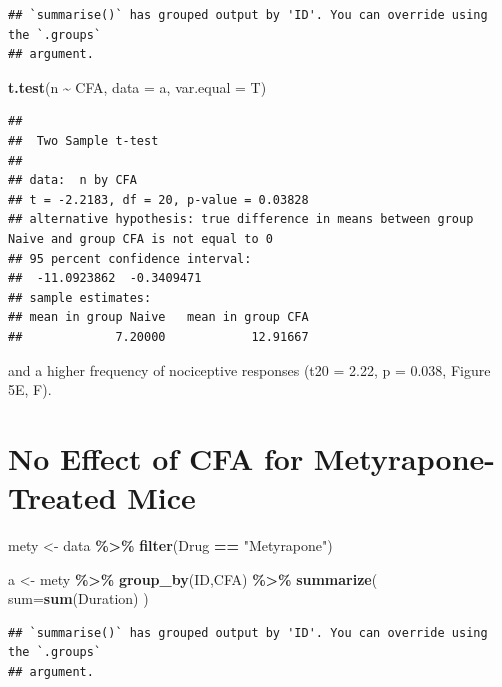 \documentclass[
]{book}
\newenvironment{Shaded}{\begin{snugshade}}{\end{snugshade}}
\newcommand{\AttributeTok}[1]{\textcolor[rgb]{0.13,0.29,0.53}{#1}}
\newcommand{\FunctionTok}[1]{\textcolor[rgb]{0.13,0.29,0.53}{\textbf{#1}}}
\newcommand{\NormalTok}[1]{#1}
\newcommand{\OtherTok}[1]{\textcolor[rgb]{0.56,0.35,0.01}{#1}}
\newcommand{\SpecialCharTok}[1]{\textcolor[rgb]{0.81,0.36,0.00}{\textbf{#1}}}
\newcommand{\StringTok}[1]{\textcolor[rgb]{0.31,0.60,0.02}{#1}}
\begin{document}
\begin{verbatim}
## `summarise()` has grouped output by 'ID'. You can override using the `.groups`
## argument.
\end{verbatim}

\begin{Shaded}
\begin{Highlighting}[]
\FunctionTok{t.test}\NormalTok{(n }\SpecialCharTok{\textasciitilde{}}\NormalTok{ CFA, }\AttributeTok{data =}\NormalTok{ a, }\AttributeTok{var.equal =}\NormalTok{ T)}
\end{Highlighting}
\end{Shaded}

\begin{verbatim}
## 
##  Two Sample t-test
## 
## data:  n by CFA
## t = -2.2183, df = 20, p-value = 0.03828
## alternative hypothesis: true difference in means between group Naive and group CFA is not equal to 0
## 95 percent confidence interval:
##  -11.0923862  -0.3409471
## sample estimates:
## mean in group Naive   mean in group CFA 
##             7.20000            12.91667
\end{verbatim}

and a higher frequency of nociceptive responses (t20 = 2.22, p = 0.038, Figure 5E, F).

\section*{No Effect of CFA for Metyrapone-Treated Mice}\label{no-effect-of-cfa-for-metyrapone-treated-mice}

\begin{Shaded}
\begin{Highlighting}[]
\NormalTok{mety }\OtherTok{\textless{}{-}}\NormalTok{ data }\SpecialCharTok{\%\textgreater{}\%}
  \FunctionTok{filter}\NormalTok{(Drug }\SpecialCharTok{==} \StringTok{"Metyrapone"}\NormalTok{)}

\NormalTok{a }\OtherTok{\textless{}{-}}\NormalTok{ mety }\SpecialCharTok{\%\textgreater{}\%}
  \FunctionTok{group\_by}\NormalTok{(ID,CFA) }\SpecialCharTok{\%\textgreater{}\%}
  \FunctionTok{summarize}\NormalTok{(}
    \AttributeTok{sum=}\FunctionTok{sum}\NormalTok{(Duration)}
\NormalTok{  )}
\end{Highlighting}
\end{Shaded}

\begin{verbatim}
## `summarise()` has grouped output by 'ID'. You can override using the `.groups`
## argument.
\end{verbatim}
\end{document}
